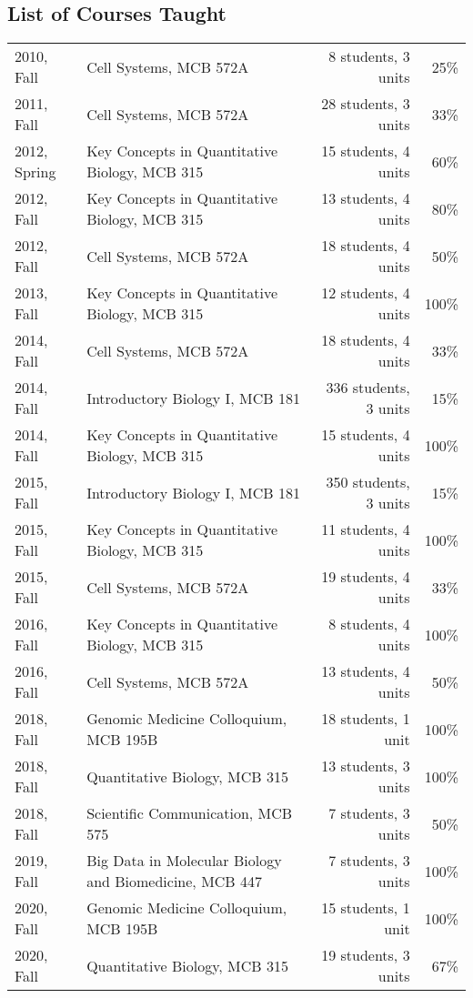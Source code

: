 \documentclass[11pt]{article}
\begin{document}
\subsection*{List of Courses Taught}
\begin{longtable}[l]{l l r r}
2010, Fall & Cell Systems, MCB 572A & 8 students, 3 units & 25\%\\
2011, Fall & Cell Systems, MCB 572A & 28 students, 3 units & 33\%\\
2012, Spring & Key Concepts in Quantitative Biology, MCB 315 & 15 students, 4 units & 60\%\\
2012, Fall & Key Concepts in Quantitative Biology, MCB 315 & 13 students, 4 units & 80\%\\
2012, Fall & Cell Systems, MCB 572A & 18 students, 4 units & 50\%\\
2013, Fall & Key Concepts in Quantitative Biology, MCB 315 & 12 students, 4 units & 100\%\\
2014, Fall & Cell Systems, MCB 572A & 18 students, 4 units & 33\%\\
2014, Fall & Introductory Biology I, MCB 181 & 336 students, 3 units & 15\%\\
2014, Fall & Key Concepts in Quantitative Biology, MCB 315 & 15 students, 4 units & 100\%\\
2015, Fall & Introductory Biology I, MCB 181 & 350 students, 3 units & 15\%\\
2015, Fall & Key Concepts in Quantitative Biology, MCB 315 & 11 students, 4 units & 100\%\\
2015, Fall & Cell Systems, MCB 572A & 19 students, 4 units & 33\%\\
2016, Fall & Key Concepts in Quantitative Biology, MCB 315 & 8 students, 4 units & 100\%\\
2016, Fall & Cell Systems, MCB 572A & 13 students, 4 units & 50\%\\
2018, Fall & Genomic Medicine Colloquium, MCB 195B & 18 students, 1 unit& 100\%\\
2018, Fall & Quantitative Biology, MCB 315 & 13 students, 3 units & 100\%\\
2018, Fall & Scientific Communication, MCB 575 & 7 students, 3 units & 50\%\\
2019, Fall & Big Data in Molecular Biology and Biomedicine, MCB 447 & 7 students, 3 units & 100\%\\
2020, Fall & Genomic Medicine Colloquium, MCB 195B & 15 students, 1 unit& 100\%\\
2020, Fall & Quantitative Biology, MCB 315 & 19 students, 3 units & 67\%\\

\end{longtable}
\end{document}
